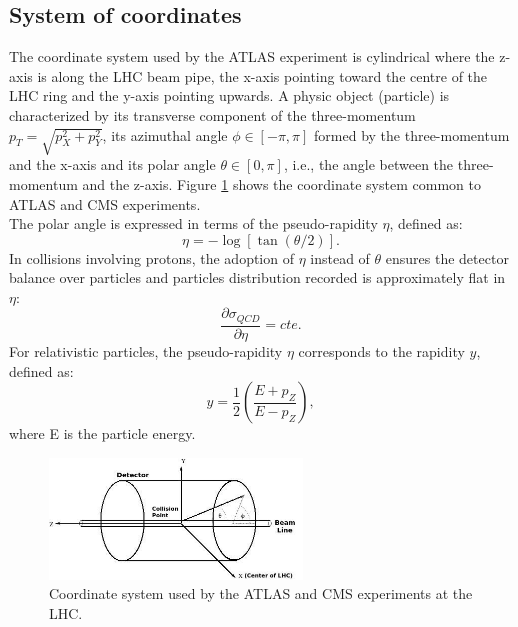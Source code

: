 \subsection{System of coordinates}
\label{chap2:ATLAS:CS}
The coordinate system used by the ATLAS experiment is cylindrical where the z-axis is along the LHC beam pipe, the x-axis pointing toward the centre of the LHC ring and the y-axis pointing upwards. A physic object (particle) is characterized by its transverse component of the three-momentum $p_T = \sqrt{p_X^2 + p_Y^2}$, its azimuthal angle $\phi \in [-\pi,\pi] $ formed by the three-momentum and the x-axis and its polar angle $\theta \in [0,\pi]$, i.e., the angle between the three-momentum and the z-axis. Figure \ref{fig:chap2:ATLAS:SYS} shows the coordinate system common to ATLAS and CMS experiments. \\
The polar angle is expressed in terms of the pseudo-rapidity $\eta$, defined as:
\begin{equation}
\eta = -\log[\tan(\theta/2)].
\end{equation}
In collisions involving protons, the adoption of $\eta$ instead of $\theta$ ensures the detector balance over particles and particles distribution recorded is approximately flat in $\eta$:
\begin{equation}
\frac{\partial\sigma_{QCD}}{\partial\eta} = cte.
\end{equation}
For relativistic particles, the pseudo-rapidity $\eta$ corresponds to the rapidity $y$, defined as:
\begin{equation}
y = \frac{1}{2}(\frac{E+p_Z}{E-p_Z}),
\end{equation}
where E is the particle energy.
\begin{figure}[htbp]
    \centering
    \includegraphics[width=0.6\textwidth]{Ch2/Img/ATLAS_Sys.jpeg}
    \caption{Coordinate system used by the ATLAS and CMS experiments at the LHC.}
    \label{fig:chap2:ATLAS:SYS}
\end{figure}

